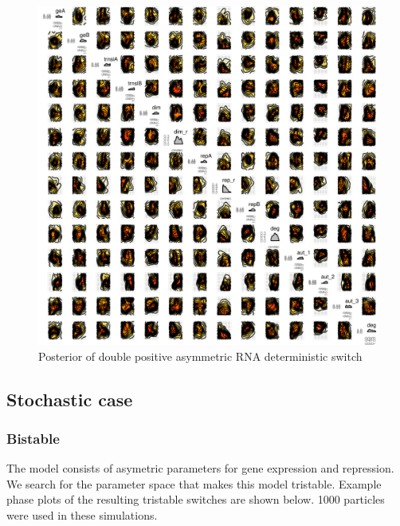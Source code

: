 \begin{figure}[htbp]
\begin{center}
\includegraphics[scale=0.15]{chapterStabilityFinder/mass_action_switches/deterministic/asym/posterior_dp_rna.png}
\caption{Posterior of double positive asymmetric RNA deterministic switch}\label{fig:asym_det_dp_rna_ma_post}
\end{center}
\end{figure}




\clearpage


\subsection{Stochastic case}
\subsubsection{Bistable} 
The model consists of asymetric parameters for gene expression and repression. We search for the parameter space that makes this model tristable. Example phase plots of the resulting tristable switches are shown below. 1000 particles were used in these simulations.


